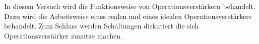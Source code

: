 
In diesem Versuch wird die Funktionsweise von Operationsverstärkern behandelt.
Dazu wird die Arbeitsweise eines realen und eines idealen Operationsverstärkers behandelt.
Zum Schluss werden Schaltungen diskutiert die sich Operationsverstärker zunutze machen.  